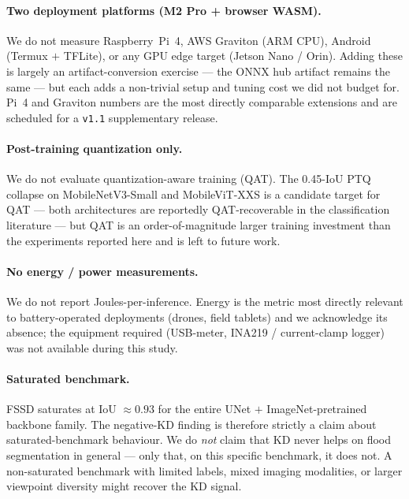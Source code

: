 \paragraph{Two deployment platforms (M2 Pro + browser WASM).} We do not measure Raspberry~Pi~4, AWS Graviton (ARM CPU), Android (Termux $+$ TFLite), or any GPU edge target (Jetson Nano / Orin). Adding these is largely an artifact-conversion exercise --- the ONNX hub artifact remains the same --- but each adds a non-trivial setup and tuning cost we did not budget for. Pi~4 and Graviton numbers are the most directly comparable extensions and are scheduled for a \texttt{v1.1} supplementary release.

\paragraph{Post-training quantization only.} We do not evaluate quantization-aware training (QAT). The 0.45-IoU PTQ collapse on MobileNetV3-Small and MobileViT-XXS is a candidate target for QAT --- both architectures are reportedly QAT-recoverable in the classification literature --- but QAT is an order-of-magnitude larger training investment than the experiments reported here and is left to future work.

\paragraph{No energy / power measurements.} We do not report Joules-per-inference. Energy is the metric most directly relevant to battery-operated deployments (drones, field tablets) and we acknowledge its absence; the equipment required (USB-meter, INA219 / current-clamp logger) was not available during this study.

\paragraph{Saturated benchmark.} FSSD saturates at IoU $\approx 0.93$ for the entire UNet $+$ ImageNet-pretrained backbone family. The negative-KD finding is therefore strictly a claim about saturated-benchmark behaviour. We do \emph{not} claim that KD never helps on flood segmentation in general --- only that, on this specific benchmark, it does not. A non-saturated benchmark with limited labels, mixed imaging modalities, or larger viewpoint diversity might recover the KD signal.
